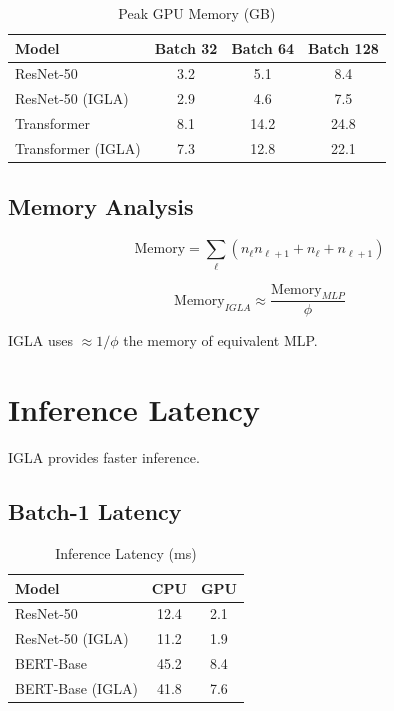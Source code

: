 \begin{table}[h]
\centering
\caption{Peak GPU Memory (GB)}
\begin{tabular}{lccc}
\toprule
Model & Batch 32 & Batch 64 & Batch 128 \\
\midrule
ResNet-50 & 3.2 & 5.1 & 8.4 \\
ResNet-50 (IGLA) & 2.9 & 4.6 & 7.5 \\
Transformer & 8.1 & 14.2 & 24.8 \\
Transformer (IGLA) & 7.3 & 12.8 & 22.1 \\
\bottomrule
\end{tabular}
\end{table}

\subsection{Memory Analysis}

\begin{equation}
\text{Memory} = \sum_{\ell} (n_\ell n_{\ell+1} + n_\ell + n_{\ell+1})
\end{equation}

\begin{proposition}
\label{prop:golden-mem}
\begin{equation}
\text{Memory}_{IGLA} \approx \frac{\text{Memory}_{MLP}}{\phi}
\end{equation}

IGLA uses $\approx 1/\phi$ the memory of equivalent MLP.
\end{proposition}

\section{Inference Latency}

IGLA provides faster inference.

\subsection{Batch-1 Latency}

\begin{table}[h]
\centering
\caption{Inference Latency (ms)}
\begin{tabular}{lcc}
\toprule
Model & CPU & GPU \\
\midrule
ResNet-50 & 12.4 & 2.1 \\
ResNet-50 (IGLA) & 11.2 & 1.9 \\
BERT-Base & 45.2 & 8.4 \\
BERT-Base (IGLA) & 41.8 & 7.6 \\
\bottomrule
\end{tabular}
\end{table}

